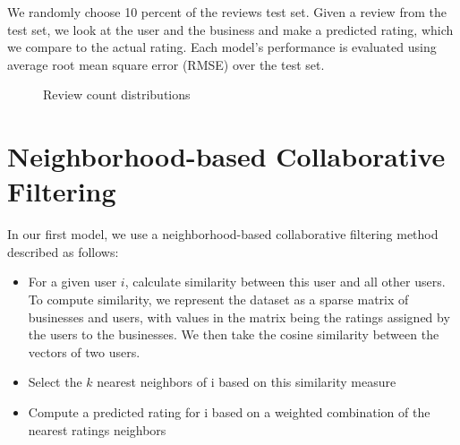 \documentclass[10pt, letterpaper]{article}
\begin{document}
We randomly choose 10 percent of the reviews test set. Given a review 
from the test set, we look at the user and the business and make a predicted 
rating, which we compare to the actual rating. Each model's performance is 
evaluated using average root mean square error (RMSE) over the test set.


\begin{figure}[htb]
  \centering

            \caption{Review count distributions}
            \label{review_count}

\end{figure}

\section{Neighborhood-based Collaborative Filtering}
In our first model, we use a neighborhood-based collaborative filtering method 
described as follows:
\begin{itemize}
\item For a given user $i$, calculate similarity between this user and all other
users. To compute similarity, we represent the dataset as a sparse matrix
of businesses and users, with values in the matrix being the ratings
assigned by the users to the businesses. We then take the cosine similarity
between the vectors of two users.
\item Select the $k$ nearest neighbors of i based on this similarity measure
\item Compute a predicted rating for i based on a weighted combination of the
  nearest ratings neighbors
\end{itemize}
\end{document}

